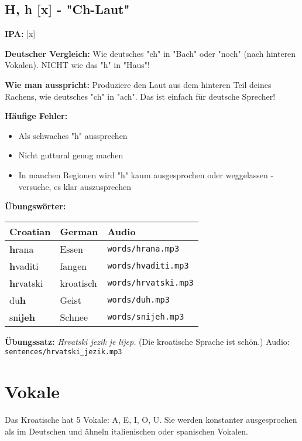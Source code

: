 \subsection{H, h [x] - "Ch-Laut"}

\begin{tcolorbox}[colback=lightyellow!30, colframe=orange, title=\textbf{H, h}]

\textbf{IPA:} [x]

\textbf{Deutscher Vergleich:}
Wie deutsches "ch" in "Bach" oder "noch" (nach hinteren Vokalen). NICHT wie das "h" in "Haus"!

\textbf{Wie man ausspricht:}
Produziere den Laut aus dem hinteren Teil deines Rachens, wie deutsches "ch" in "ach". Das ist einfach für deutsche Sprecher!

\textbf{Häufige Fehler:}
\begin{itemize}
    \item Als schwaches "h" aussprechen
    \item Nicht guttural genug machen
    \item In manchen Regionen wird "h" kaum ausgesprochen oder weggelassen - versuche, es klar auszusprechen
\end{itemize}

\textbf{Übungswörter:}
\begin{tabular}{lll}
\textbf{Croatian} & \textbf{German} & \textbf{Audio} \\
\midrule
\textbf{h}rana & Essen & \texttt{words/hrana.mp3} \\
\textbf{h}vaditi & fangen & \texttt{words/hvaditi.mp3} \\
\textbf{h}rvatski & kroatisch & \texttt{words/hrvatski.mp3} \\
du\textbf{h} & Geist & \texttt{words/duh.mp3} \\
sni\textbf{jeh} & Schnee & \texttt{words/snijeh.mp3} \\
\end{tabular}

\textbf{Übungssatz:}
\textit{Hrvatski jezik je lijep.}
(Die kroatische Sprache ist schön.)
Audio: \texttt{sentences/hrvatski\_jezik.mp3}

\end{tcolorbox}

\section{Vokale}

Das Kroatische hat 5 Vokale: A, E, I, O, U. Sie werden konstanter ausgesprochen als im Deutschen und ähneln italienischen oder spanischen Vokalen.

